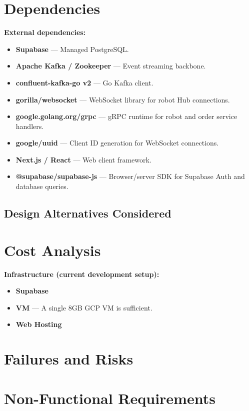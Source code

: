 \documentclass[12pt,a4paper]{article}
\begin{document}
\section{Dependencies}
\textbf{External dependencies:}
\begin{itemize}
  \item \textbf{Supabase} --- Managed PostgreSQL.
  \item \textbf{Apache Kafka / Zookeeper}  --- Event streaming backbone.
  \item \textbf{confluent-kafka-go v2} --- Go Kafka client.
  \item \textbf{gorilla/websocket} --- WebSocket library for robot Hub connections.
  \item \textbf{google.golang.org/grpc} --- gRPC runtime for robot and order service handlers.
  \item \textbf{google/uuid} --- Client ID generation for WebSocket connections.
  \item \textbf{Next.js / React} --- Web client framework.
  \item \textbf{@supabase/supabase-js} --- Browser/server SDK for Supabase Auth and database queries.
\end{itemize}

\subsection{Design Alternatives Considered}

\newpage
\section{Cost Analysis}
\textbf{Infrastructure (current development setup):}
\begin{itemize}
  \item \textbf{Supabase}
  \item \textbf{VM} --- A single 8GB GCP VM is sufficient.
  \item \textbf{Web Hosting}
\end{itemize}

\newpage
\section{Failures and Risks}

\newpage
\section{Non-Functional Requirements}
\end{document}

